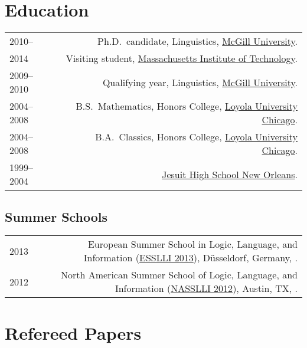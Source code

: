 \documentclass[letterpaper]{article}
\makeatletter
\newcommand{\formatdatenoday}[2]{\mydatenoday\formatdate{0}{#1}{#2}}
\newcommand{\myvrule}{\color{lightgray}\vrule width 1.0pt}
\newenvironment{cvsection}{%
  \renewcommand{\arraystretch}{1.75}
  \begin{longtable}[l]{@{} L R @{}}
}{%
  \end{longtable}
}
\makeatother
\begin{document}

\section*{Education}

\begin{cvsection}
  2010-- & Ph.D.~candidate, Linguistics, \href{http://www.mcgill.ca/}{McGill
  University}. \\

  2014 & Visiting student,
  \href{http://www.mit.edu/}{Massachusetts Institute of Technology}. \\

  2009--2010 & Qualifying year, Linguistics,
  \href{http://www.mcgill.ca/}{McGill University}. \\

  2004--2008 & B.S.~Mathematics, Honors College,
  \href{http://www.luc.edu/}{Loyola University Chicago}. \\

  2004--2008 & B.A.~Classics, Honors College, \href{http://www.luc.edu/}{Loyola
  University Chicago}. \\

  1999--2004 & \href{http://www.jesuitnola.org/about/aboutindex.htm}{Jesuit
  High School New Orleans}. \\
\end{cvsection}

\vspace{-1ex}
\subsection*{Summer Schools}

\begin{cvsection}
  2013 & European Summer School in Logic, Language, and Information
  (\href{http://esslli2013.de/}{ESSLLI 2013}), D\"{u}sseldorf, Germany,
  \formatdatenoday{8}{2013}. \\

  2012 & North American Summer School of Logic, Language, and Information
  (\href{http://nasslli2012.com/}{NASSLLI 2012}), Austin, TX,
  \formatdatenoday{6}{2012}. \\
\end{cvsection}



\section*{Refereed Papers}
\end{document}

